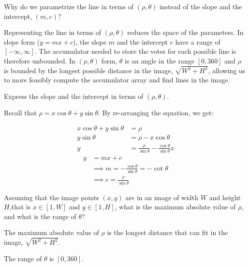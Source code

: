 \newpage
\begin{problem}
  \begin{enumroman}
  \item Why do we parametrize the line in terms of $(\rho, \theta)$
  instead of the slope and the intercept, $(m, c)$?
  \begin{Answer}
    Representing the line in terms of $(\rho, \theta)$
    reduces the space of the parameters.
    In slope form ($y = mx + c$), the slope $m$ and the intercept $c$
    have a range of $[-\infty, \infty]$.
    The accumulator needed to store the votes for each possible
    line is therefore unbounded.
    In $(\rho, \theta)$ form, $\theta$ is an angle in the range
    $[0, 360]$ and $\rho$ is bounded by the longest possible distance
    in the image, $\sqrt{W^2 + H^2}$, allowing us to more feasibly
    compute the accumulator array and find lines in the image.
  \end{Answer}

  \item Express the slope and the intercept in terms of $(\rho, \theta)$.
  \begin{Answer}
    Recall that $\rho = x \cos \theta + y \sin \theta$.
    By re-arranging the equation, we get:
    \begin{multicols}{2}
      \noindent
      \begin{align*}
        x \cos \theta + y \sin \theta &= \rho \\
        y \sin \theta &= \rho - x \cos \theta \\
        y &= \frac{\rho}{\sin \theta} - \frac{\cos \theta}{\sin \theta}x
      \end{align*}
      \begin{align*}
        y &= mx + c \\
        &\implies m = - \frac{\cos \theta}{\sin \theta} = -\cot \theta \\
        &\implies c = \frac{\rho}{\sin \theta}
      \end{align*}
    \end{multicols}
  \end{Answer}
  \end{enumroman}
\end{problem}

\begin{problem}
  Assuming that the image points $(x, y)$ are in an image
  of width $W$ and height $H$,that is $x \in [1, W]$ and $y \in [1, H]$,
  what is the maximum absolute value of $\rho$,
  and what is the range of $\theta$?
  \begin{Answer}
    The maximum absolute value of $\rho$ is the longest distance
    that can fit in the image, $\sqrt{W^2 + H^2}$.

    \step
    The range of $\theta$ is $[0, 360]$.
  \end{Answer}
\end{problem}

